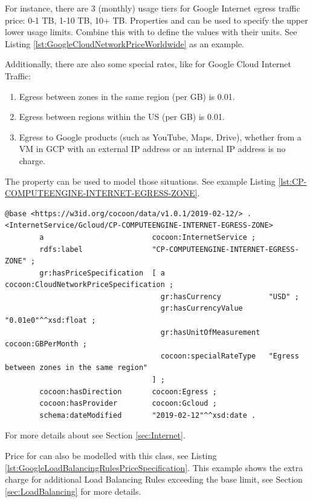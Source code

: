 For instance, there are 3 (monthly) usage tiers for Google Internet egress traffic price: 0-1 TB, 1-10 TB, 10+ TB.
Properties  and   can be used to specify the upper lower usage limits.
Combine this with  to define the values with their units.
See Listing \ref{lst:GoogleCloudNetworkPriceWorldwide} as an example.

Additionally, there are also some special rates,
like for Google Cloud Internet Traffic:
\begin{enumerate}
  \item Egress between zones in the same region (per GB) is 0.01.
  \item Egress between regions within the US (per GB) is 0.01.
  \item Egress to Google products (such as YouTube, Maps, Drive), whether from a VM in GCP with an external IP address or an internal IP address is no charge.
\end{enumerate}
The property  can be used to model those situations.
See example Listing \ref{lst:CP-COMPUTEENGINE-INTERNET-EGRESS-ZONE}.

\begin{lstlisting}[caption={Price for Google Internet Egress between Zones in the Same Region},label={lst:CP-COMPUTEENGINE-INTERNET-EGRESS-ZONE}]
@base <https://w3id.org/cocoon/data/v1.0.1/2019-02-12/> .
<InternetService/Gcloud/CP-COMPUTEENGINE-INTERNET-EGRESS-ZONE>
        a                         cocoon:InternetService ;
        rdfs:label                "CP-COMPUTEENGINE-INTERNET-EGRESS-ZONE" ;
        gr:hasPriceSpecification  [ a                        cocoon:CloudNetworkPriceSpecification ;
                                    gr:hasCurrency           "USD" ;
                                    gr:hasCurrencyValue      "0.01e0"^^xsd:float ;
                                    gr:hasUnitOfMeasurement  cocoon:GBPerMonth ;
                                    cocoon:specialRateType   "Egress between zones in the same region"
                                  ] ;
        cocoon:hasDirection       cocoon:Egress ;
        cocoon:hasProvider        cocoon:Gcloud ;
        schema:dateModified       "2019-02-12"^^xsd:date .
\end{lstlisting}

For more details about  see Section \ref{sec:Internet}.

Price for  can also be modelled with this class, see Listing \ref{lst:GoogleLoadBalancingRulesPriceSpecification}.
This example shows the extra charge for additional Load Balancing Rules
exceeding the base limit, see Section \ref{sec:LoadBalancing} for more details.

